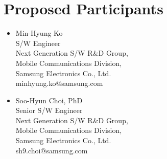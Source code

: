 \documentclass[a4paper]{spie}  %
\begin{document}
\section{Proposed Participants} \label{sect:ppl}

\begin{itemize}
    \item Min-Hyung Ko \\
        {\small S/W Engineer \\
        Next Generation S/W R\&D Group, \\
        Mobile Communications Division, \\
        Samsung Electronics Co., Ltd.}\\
        \textsf{minhyung.ko@samsung.com}

    \item Soo-Hyun Choi, PhD \\
        {\small Senior S/W Engineer \\
        Next Generation S/W R\&D Group, \\
        Mobile Communications Division, \\
        Samsung Electronics Co., Ltd.}\\
        \textsf{sh9.choi@samsung.com}
\end{itemize}




\end{document}
